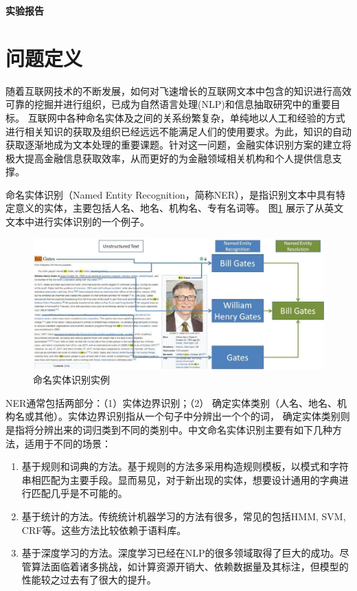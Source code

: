 \documentclass[11pt]{article}
\begin{document}
\begin{center}
    \bf{实验报告 }
\end{center}

\vspace{-5mm}
\section{问题定义}\label{Theory}
\vspace{-2mm}
随着互联网技术的不断发展，如何对飞速增长的互联网文本中包含的知识进行高效可靠的挖掘并进行组织，已成为自然语言处理(NLP)和信息抽取研究中的重要目标。%
互联网中各种命名实体及之间的关系纷繁复杂，单纯地以人工和经验的方式进行相关知识的获取及组织已经远远不能满足人们的使用要求。为此，知识的自动%
获取逐渐地成为文本处理的重要课题。针对这一问题，金融实体识别方案的建立将极大提高金融信息获取效率，从而更好的为金融领域相关机构和个人提供信息支撑。\par

命名实体识别（Named Entity Recognition，简称NER），是指识别文本中具有特定意义的实体，主要包括人名、地名、机构名、专有名词等。%
图\ref{illustration_ner} 展示了从英文文本中进行实体识别的一个例子。

\begin{figure}[!ht]
    \centering
    \includegraphics[height=2in]{pic/NER.jpg}
    \caption{命名实体识别实例}
    \label{illustration_ner}
\end{figure}

NER通常包括两部分：（1）实体边界识别；（2） 确定实体类别（人名、地名、机构名或其他）。实体边界识别指从一个句子中分辨出一个个的词，%
确定实体类别则是指将分辨出来的词归类到不同的类别中。中文命名实体识别主要有如下几种方法，适用于不同的场景：

\begin{enumerate}
    \item 基于规则和词典的方法。基于规则的方法多采用构造规则模板，以模式和字符串相匹配为主要手段。显而易见，对于新出现的实体，想要设计通用的字典进行匹配几乎是不可能的。
    \item 基于统计的方法。传统统计机器学习的方法有很多，常见的包括HMM, SVM, CRF等。这些方法比较依赖于语料库。
    \item 基于深度学习的方法。深度学习已经在NLP的很多领域取得了巨大的成功。尽管算法面临着诸多挑战，如计算资源开销大、依赖数据量及其标注，但模型的性能较之过去有了很大的提升。
\end{enumerate}
\end{document}
